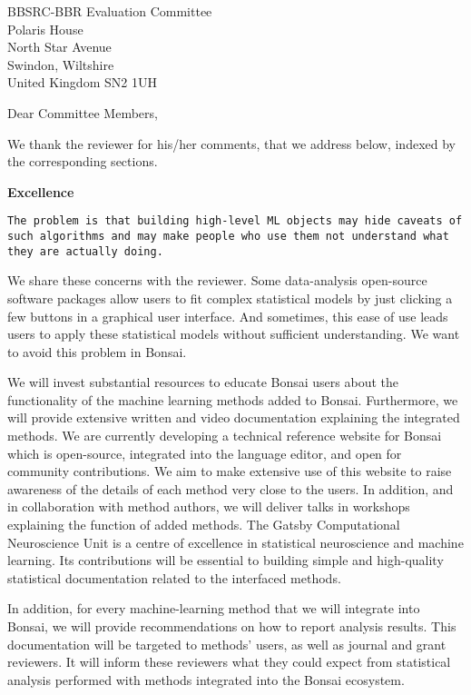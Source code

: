 \documentclass[12pt]{letter}
\begin{document}
\begin{letter}{
    BBSRC-BBR Evaluation Committee\\
    Polaris House\\
    North Star Avenue\\
    Swindon, Wiltshire\\
    United Kingdom SN2 1UH
}
\opening{Dear Committee Members,}

We thank the reviewer for his/her comments, that we address below, indexed by
the corresponding sections.

\noindent\textbf{Excellence}

\texttt{The problem is that building high-level ML objects may hide caveats of
such algorithms and may make people who use them not understand what they are
actually doing.}

We share these concerns with the reviewer. Some data-analysis open-source
software packages allow users to fit complex statistical models by just
clicking a few buttons in a graphical user interface. And sometimes, this ease
of use leads users to apply these statistical models without sufficient
understanding. We want to avoid this problem in Bonsai.

We will invest substantial resources to educate Bonsai users about the
functionality of the machine learning methods added to Bonsai. Furthermore, we will provide
extensive written and video documentation explaining the integrated methods. We are currently developing a technical reference  website for Bonsai which is open-source, integrated into the language editor, and open for community contributions. We aim to make extensive use of this website to raise awareness of the details of each method very close to the users.  In
addition, and in collaboration with method authors, we will deliver talks in
workshops explaining the function of added methods.
%
The Gatsby Computational Neuroscience Unit is a centre of excellence in
statistical neuroscience and machine learning. Its contributions will be
essential to building simple and high-quality statistical documentation related to
the interfaced methods.

In addition, for every machine-learning method that we will integrate into
Bonsai, we will provide recommendations on how to report analysis results.
This documentation will be targeted to methods' users, as well as journal and
grant reviewers. It will inform these reviewers what they could expect from
statistical analysis performed with methods integrated into the Bonsai
ecosystem.


\end{letter}
\end{document}
